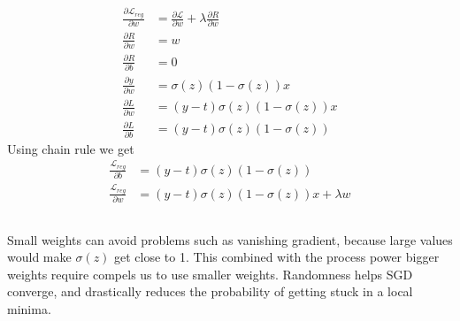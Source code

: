 \documentclass{article}
\begin{document}
\subsection{}
\begin{align*}
    \frac{\partial \mathcal{L}_{reg}}{\partial w} &= \frac{\partial \mathcal{L}}{\partial w} + \lambda \frac{\partial R}{\partial w} \\
    \frac{\partial R}{\partial w} &= w \\
    \frac{\partial R}{\partial b} &= 0 \\
    \frac{\partial y}{\partial w} &= \sigma(z) (1 - \sigma(z)) x \\
    \frac{\partial L}{\partial w} &= (y - t) \sigma(z) (1 - \sigma(z)) x \\
    \frac{\partial L}{\partial b} &= (y - t) \sigma(z) (1 - \sigma(z))
\end{align*}
Using chain rule we get
\begin{align*}
    \frac{\mathcal{L}_{reg}}{\partial b} &= (y - t) \sigma(z) (1 - \sigma(z)) \\
    \frac{\mathcal{L}_{reg}}{\partial w} &= (y - t) \sigma(z) (1 - \sigma(z)) x + \lambda w
\end{align*}
\subsection{}
Small weights can avoid problems such as vanishing gradient, because large values would make $\sigma(z)$ get close to 1. This combined with the process power bigger weights require compels us to use smaller weights. Randomness helps SGD converge, and drastically reduces the probability of getting stuck in a local minima.
\end{document}
